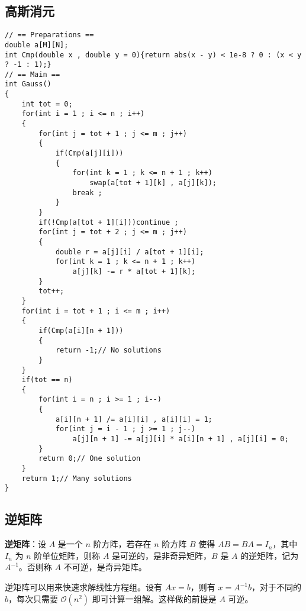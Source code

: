 \subsection{高斯消元}

\begin{verbatim}
// == Preparations ==
double a[M][N];
int Cmp(double x , double y = 0){return abs(x - y) < 1e-8 ? 0 : (x < y ? -1 : 1);}
// == Main ==
int Gauss()
{
    int tot = 0;
    for(int i = 1 ; i <= n ; i++)
    {
        for(int j = tot + 1 ; j <= m ; j++)
        {
            if(Cmp(a[j][i]))
            {
                for(int k = 1 ; k <= n + 1 ; k++)
                    swap(a[tot + 1][k] , a[j][k]);
                break ;
            }
        }
        if(!Cmp(a[tot + 1][i]))continue ;
        for(int j = tot + 2 ; j <= m ; j++)
        {
            double r = a[j][i] / a[tot + 1][i];
            for(int k = 1 ; k <= n + 1 ; k++)
                a[j][k] -= r * a[tot + 1][k];   
        }
        tot++;
    }
    for(int i = tot + 1 ; i <= m ; i++)
    {
        if(Cmp(a[i][n + 1]))
        {
            return -1;// No solutions
        }
    }
    if(tot == n)
    {
        for(int i = n ; i >= 1 ; i--)
        {
            a[i][n + 1] /= a[i][i] , a[i][i] = 1;   
            for(int j = i - 1 ; j >= 1 ; j--)
                a[j][n + 1] -= a[j][i] * a[i][n + 1] , a[j][i] = 0;
        }
        return 0;// One solution
    }
    return 1;// Many solutions
}
\end{verbatim}

\subsection{逆矩阵}

\begin{tcolorbox}
    \textbf{逆矩阵}：设 $A$ 是一个 $n$ 阶方阵，若存在 $n$ 阶方阵 $B$ 使得 $AB=BA=I_n$，其中 $I_n$ 为 $n$ 阶单位矩阵，则称 $A$ 是可逆的，是非奇异矩阵，$B$ 是 $A$ 的逆矩阵，记为 $A^{-1}$。否则称 $A$ 不可逆，是奇异矩阵。
\end{tcolorbox}

逆矩阵可以用来快速求解线性方程组。设有 $Ax=b$，则有 $x=A^{-1}b$，对于不同的 $b$，每次只需要 $\mathcal{O}(n^2)$ 即可计算一组解。这样做的前提是 $A$ 可逆。

